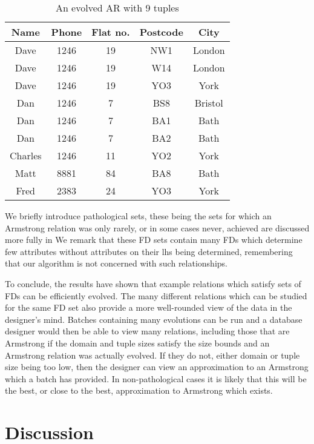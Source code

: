 {\line
\begin{table}
\begin{center}
\begin{tabular}{|c|c|c|c|c|} \hline 
{ \bf Name} & { \bf Phone} & {\bf Flat no. }  & { \bf Postcode}  & {\bf City} \\ \hline
Dave & 1246 & 19 & NW1 & London  \\
Dave & 1246 & 19 & W14 & London \\
Dave & 1246 & 19 & YO3 & York \\
Dan & 1246 & 7 & BS8 & Bristol \\
Dan & 1246 & 7 & BA1 & Bath \\
Dan & 1246 & 7 & BA2 & Bath \\
Charles & 1246 & 11 & YO2 & York \\
Matt & 8881 & 84 & BA8 & Bath \\
Fred & 2383 & 24 & YO3 & York \\ \hline
\end{tabular}
\end{center}
\caption{\label{table:5.34} An evolved AR with 9 tuples }
\end{table}
}

\medskip

We briefly introduce pathological sets, these being
the sets for which an Armstrong relation was only rarely,
or in some cases never, achieved are discussed more fully in \cite{cl96}
We remark that these FD sets contain many FDs which determine
few attributes without attributes on their lhs being determined,
remembering that 
our algorithm is not concerned with such relationships.

\medskip
To conclude, the results have shown that example relations which satisfy sets
of FDs can be efficiently evolved. The many different
relations which can be studied for the same FD set also provide a
more well-rounded view of the data in the designer's mind.
Batches containing
many evolutions can be run and a database designer would then be able
to view many relations, including those that are Armstrong if the domain
and tuple sizes satisfy the size bounds and an Armstrong relation
was actually evolved.  If they do not, either domain
or tuple size being too low, then the designer can view an
approximation to an Armstrong which a batch has provided. In
non-pathological cases it is likely that
this will be the best, or close to the best, approximation to Armstrong
which exists.

\section{Discussion}\label{sec:nd_disc}

